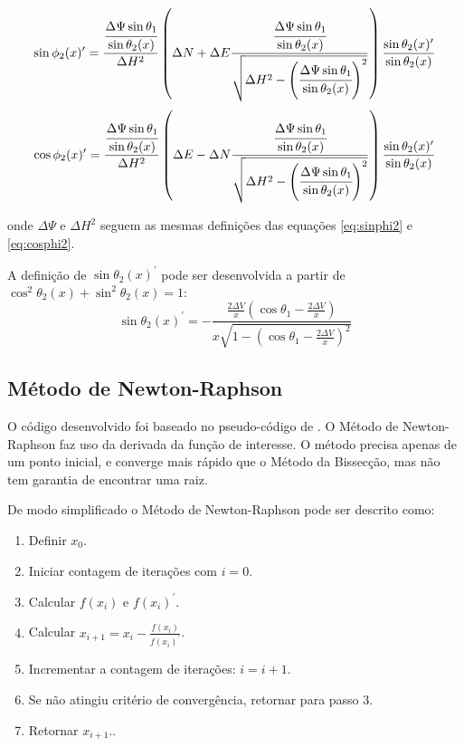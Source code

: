 \documentclass[final,3p,12pt]{elsarticle}
\begin{document}
\begin{equation} \label{eq:sinphi2prime}
    \sin \phi_2(x)^{\prime} = \frac{\cfrac{\Delta \Psi \sin \theta_1}{\sin \theta_2(x)}}{\Delta H^2} \left( \Delta N + \Delta E \frac{\cfrac{\Delta \Psi \sin \theta_1}{\sin \theta_2(x)} }{\sqrt{\Delta H^2 - \left( \cfrac{\Delta \Psi \sin \theta_1}{\sin \theta_2(x)} \right)^2}} \right) \frac{\sin \theta_2(x)^{\prime}}{\sin \theta_2(x)} 
\end{equation}
\begin{equation} \label{eq:cosphi2prime}
    \cos \phi_2(x)^{\prime} = \frac{\cfrac{\Delta \Psi \sin \theta_1}{\sin \theta_2(x)}}{\Delta H^2} \left( \Delta E - \Delta N \frac{\cfrac{\Delta \Psi \sin \theta_1}{\sin \theta_2(x)} }{\sqrt{\Delta H^2 - \left( \cfrac{\Delta \Psi \sin \theta_1}{\sin \theta_2(x)} \right)^2}} \right) \frac{\sin \theta_2(x)^{\prime}}{\sin \theta_2(x)} 
\end{equation}

onde $\Delta \Psi$ e $\Delta H^2$ seguem as mesmas definições das equações \ref{eq:sinphi2} e \ref{eq:cosphi2}.

A definição de $\sin \theta_2(x)^{\prime}$ pode ser desenvolvida a partir de $\cos^2 \theta_2(x) + \sin^2 \theta_2(x) = 1$:
\begin{equation} \label{eq:sintheta2prime}
    \sin \theta_2(x)^{\prime} = - \frac{\frac{2 \Delta V}{x}(\cos \theta_1 - \frac{2 \Delta V}{x})}{x \sqrt{1-\left(\cos \theta_1 - \frac{2 \Delta V}{x} \right)^2}}
\end{equation}

    \subsection{Método de Newton-Raphson}
    
    O código desenvolvido foi baseado no pseudo-código de \cite{burden2016analise}. O Método de Newton-Raphson faz uso da derivada da função de interesse. O método precisa apenas de um ponto inicial, e converge mais rápido que o Método da Bissecção, mas não tem garantia de encontrar uma raiz. 

    De modo simplificado o Método de Newton-Raphson pode ser descrito como:
    
    \begin{enumerate}
        \item Definir $x_0$.
        \item Iniciar contagem de iterações com $i=0$.
        \item Calcular $f(x_i)$ e $f(x_i)^{\prime}$.
        \item Calcular $x_{i+1} = x_i - \frac{f(x_i)}{f(x_i)^{\prime}}$.
        \item Incrementar a contagem de iterações: $i=i+1$.
        \item Se não atingiu critério de convergência, retornar para passo 3.
        \item Retornar $x_{i+1}.$.
    \end{enumerate}
    
\end{document}
